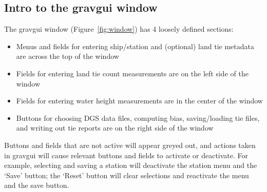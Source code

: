 \documentclass{pfpe-manual}
\begin{document}
\subsection{Intro to the gravgui window}

The gravgui window (Figure~\ref{fig:window}) has 4 loosely defined sections:
\begin{itemize}
\item Menus and fields for entering ship/station and (optional) land tie metadata are across the top of the window
\item Fields for entering land tie count measurements are on the left side of the window
\item Fields for entering water height measurements are in the center of the window
\item Buttons for choosing DGS data files, computing bias, saving/loading tie files, and writing out tie reports are on the right side of the window
\end{itemize}

Buttons and fields that are not active will appear greyed out, and actions taken in gravgui will cause relevant buttons and fields to activate or deactivate. For example, selecting and saving a station will deactivate the station menu and the `Save' button; the `Reset' button will clear selections and reactivate the menu and the save button.
\end{document}
